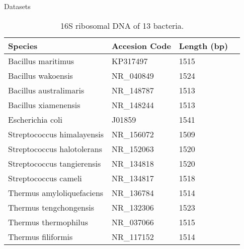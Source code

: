 \documentclass[10pt]{beamer}
\newcommand{\1}{
	\setbeamertemplate{background}{
		\texttt{[image: img/1]}
		\tikz[overlay] \fill[fill opacity=0.75,fill=white] (0,0) rectangle (-\paperwidth,\paperheight);
	}
}
\begin{document}
\begin{frame}{Datasets}
	\begin{table}[]
		\centering
		\caption{16S ribosomal DNA of 13 bacteria.}
		\label{tab:16sdb}
		\begin{tabular}{llll}
			\hline
			Species                         & Accesion Code & Length (bp) \\ \hline
			Bacillus       maritimus         & KP317497      & 1515        \\
			Bacillus       wakoensis         & NR\_040849    & 1524        \\
			Bacillus       australimaris     & NR\_148787    & 1513        \\
			Bacillus       xiamenensis       & NR\_148244    & 1513        \\
			Escherichia    coli              & J01859        & 1541        \\
			Streptococcus  himalayensis      & NR\_156072    & 1509        \\
			Streptococcus  halotolerans      & NR\_152063    & 1520        \\
			Streptococcus  tangierensis      & NR\_134818    & 1520        \\
			Streptococcus  cameli            & NR\_134817    & 1518        \\
			Thermus        amyloliquefaciens & NR\_136784    & 1514        \\
			Thermus        tengchongensis    & NR\_132306    & 1523        \\
			Thermus        thermophilus      & NR\_037066    & 1515        \\
			Thermus        filiformis        & NR\_117152    & 1514        \\ \hline
		\end{tabular} 
	\end{table}
\end{frame}
\end{document}
